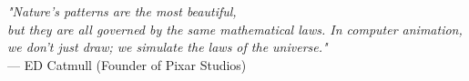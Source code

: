 \documentclass[12pt, a4paper]{report}
\begin{document}
\vspace{1cm}
\begin{center}
    \textit{"Nature’s patterns are the most beautiful,\\ but they are all governed
by the same mathematical laws. In computer animation,\\ we don’t just
draw; we simulate the laws of the universe."} \\
    --- ED Catmull (Founder of Pixar Studios)
\end{center}


\end{document}
